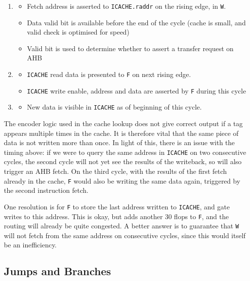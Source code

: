 \documentclass{article}
\begin{document}
\begin{enumerate}
	\item
	\begin{itemize}
		\item Fetch address is asserted to \texttt{ICACHE.raddr} on the rising edge, in \texttt{W}.
		\item Data valid bit is available before the end of the cycle (cache is small, and valid check is optimised for speed)
		\item Valid bit is used to determine whether to assert a transfer request on AHB
	\end{itemize}
	\item
	\begin{itemize}
		\item \texttt{ICACHE} read data is presented to \texttt{F} on next rising edge.
		\item \texttt{ICACHE} write enable, address and data are asserted by \texttt{F} during this cycle
	\end{itemize}
	\item
	\begin{itemize}
		\item New data is visible in \texttt{ICACHE} as of beginning of this cycle.
	\end{itemize}
\end{enumerate}

The encoder logic used in the cache lookup does not give correct output if a tag appears multiple times in the cache. It is therefore vital that the same piece of data is not written more than once. In light of this, there is an issue with the timing above: if we were to query the same address in \texttt{ICACHE} on two consecutive cycles, the second cycle will not yet see the results of the writeback, so will also trigger an AHB fetch. On the third cycle, with the results of the first fetch already in the cache, \texttt{F} would also be writing the same data again, triggered by the second instruction fetch.

One resolution is for \texttt{F} to store the last address written to \texttt{ICACHE}, and gate writes to this address. This is okay, but adds another 30 flops to \texttt{F}, and the routing will already be quite congested. A better answer is to guarantee that \texttt{W} will not fetch from the same address on consecutive cycles, since this would itself be an inefficiency.


\subsection{Jumps and Branches}
\end{document}
